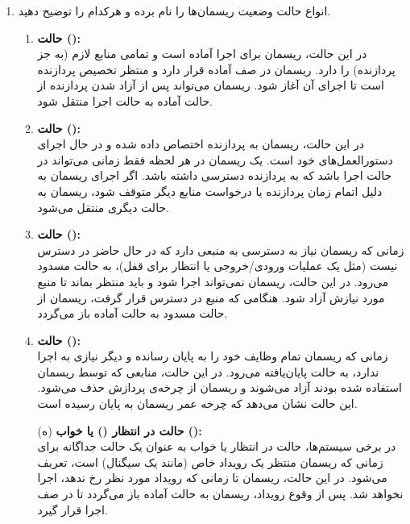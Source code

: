 \begin{enumerate}
	\item 
	انواع حالت وضعیت ریسمان‌ها را نام برده و هرکدام را توضیح دهید.
	
	\begin{qsolve}
		\begin{enumerate}
			\item 
			\textbf{حالت ():}\\
			در این حالت، ریسمان برای اجرا آماده است و تمامی منابع لازم (به جز پردازنده) را دارد.
			ریسمان در صف آماده قرار دارد و منتظر تخصیص پردازنده است تا اجرای آن آغاز شود.
			ریسمان می‌تواند پس از آزاد شدن پردازنده از حالت آماده به حالت اجرا منتقل شود.
			
			\item 
			\textbf{حالت ():}\\
			در این حالت، ریسمان به پردازنده اختصاص داده شده و در حال اجرای دستورالعمل‌های خود است.
			یک ریسمان در هر لحظه فقط زمانی می‌تواند در حالت اجرا باشد که به پردازنده دسترسی داشته باشد.
			اگر اجرای ریسمان به دلیل اتمام زمان پردازنده یا درخواست منابع دیگر متوقف شود، ریسمان به حالت دیگری منتقل می‌شود.
			
			
			\item 
			\textbf{حالت ():}\\
			زمانی که ریسمان نیاز به دسترسی به منبعی دارد که در حال حاضر در دسترس نیست (مثل یک عملیات ورودی/خروجی یا انتظار برای قفل)، به حالت مسدود می‌رود.
			در این حالت، ریسمان نمی‌تواند اجرا شود و باید منتظر بماند تا منبع مورد نیازش آزاد شود.
			هنگامی که منبع در دسترس قرار گرفت، ریسمان از حالت مسدود به حالت آماده باز می‌گردد.
			
						
			
			\item 
			\textbf{حالت ():}\\
			زمانی که ریسمان تمام وظایف خود را به پایان رسانده و دیگر نیازی به اجرا ندارد، به حالت پایان‌یافته می‌رود.
			در این حالت، منابعی که توسط ریسمان استفاده شده بودند آزاد می‌شوند و ریسمان از چرخه‌ی پردازش حذف می‌شود.
			این حالت نشان می‌دهد که چرخه عمر ریسمان به پایان رسیده است.		
		\end{enumerate}
	\end{qsolve}
	
	
	\begin{qsolve}
		\begin{enumerate}
			\item [(ه)]
			\textbf{حالت در انتظار () یا خواب (\lr{Sleep}):}\\
			در برخی سیستم‌ها، حالت در انتظار یا خواب به عنوان یک حالت جداگانه برای زمانی که ریسمان منتظر یک رویداد خاص (مانند یک سیگنال) است، تعریف می‌شود.
			در این حالت، ریسمان تا زمانی که رویداد مورد نظر رخ ندهد، اجرا نخواهد شد.
			پس از وقوع رویداد، ریسمان به حالت آماده باز می‌گردد تا در صف اجرا قرار گیرد.
		\end{enumerate}
	\end{qsolve}
	

\end{enumerate}
